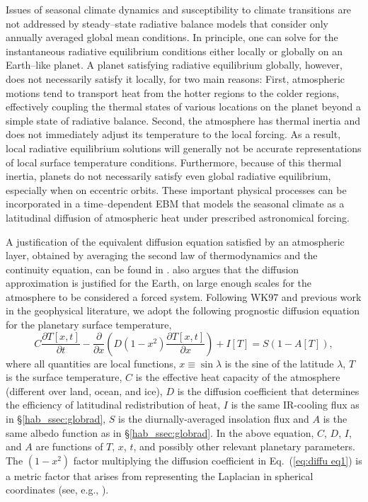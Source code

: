 Issues of seasonal climate dynamics and susceptibility to climate
transitions are not addressed by steady--state radiative balance
models that consider only annually averaged global mean conditions.
In principle, one can solve for the instantaneous radiative
equilibrium conditions either locally or globally on an Earth--like
planet.  A planet satisfying radiative equilibrium globally, however,
does not necessarily satisfy it locally, for two main reasons: First,
atmospheric motions tend to transport heat from the hotter regions to
the colder regions, effectively coupling the thermal states of various
locations on the planet beyond a simple state of radiative balance.
Second, the atmosphere has thermal inertia and does not immediately
adjust its temperature to the local forcing.  As a result, local
radiative equilibrium solutions will generally not be accurate
representations of local surface temperature conditions.  Furthermore,
because of this thermal inertia, planets do not necessarily satisfy
even global radiative equilibrium, especially when on eccentric
orbits.  These important physical processes can be incorporated in a
time--dependent EBM that models the seasonal climate as a latitudinal
diffusion of atmospheric heat under prescribed astronomical forcing.

A justification of the equivalent diffusion equation satisfied by an
atmospheric layer, obtained by averaging the second law of
thermodynamics and the continuity equation, can be found in
\citet{lorenz1979}. \citet{lorenz1979} also argues that the diffusion
approximation is justified for the Earth, on large enough scales for
the atmosphere to be considered a forced system. Following WK97 and
previous work in the geophysical literature, we adopt the following
prognostic diffusion equation for the planetary surface temperature,
\begin{equation}
\label{eq:diffu eq1}
C \frac{\partial T[x,t]}{\partial t} - \frac{\partial}{\partial x}
\left( D(1 - x^2) \frac{\partial T[x,t]}{\partial x} \right) + I[T] =
S (1 - A[T]),
\end{equation}
where all quantities are local functions, $x \equiv \sin \lambda$ is
the sine of the latitude $\lambda$, $T$ is the surface temperature,
$C$ is the effective heat capacity of the atmosphere (different over
land, ocean, and ice), $D$ is the diffusion coefficient that
determines the efficiency of latitudinal redistribution of heat, $I$
is the same IR-cooling flux as in \S\ref{hab_ssec:globrad}, $S$ is the
diurnally-averaged insolation flux and $A$ is the same albedo function
as in \S\ref{hab_ssec:globrad}. In the above equation, $C$, $D$, $I$,
and $A$ are functions of $T$, $x$, $t$, and possibly other relevant
planetary parameters. The $(1 - x^2)$ factor multiplying the diffusion
coefficient in Eq.~(\ref{eq:diffu eq1}) is a metric factor that arises
from representing the Laplacian in spherical coordinates (see, e.g.,
\citealt{north_et_al1983}).

